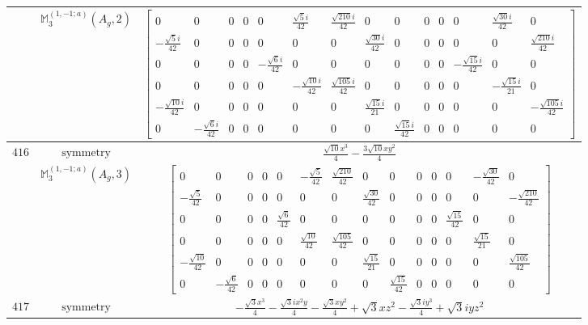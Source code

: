 \documentclass[fleqn,8pt,landscape]{jsarticle}
\begin{document}
\begin{longtable}{ccc}
$  $ & $ \mathbb{M}_{3}^{(1,-1;a)}(A_{g},2) $ & $ \begin{bmatrix} 0 & 0 & 0 & 0 & 0 & \frac{\sqrt{5} i}{42} & \frac{\sqrt{210} i}{42} & 0 & 0 & 0 & 0 & 0 & \frac{\sqrt{30} i}{42} & 0 \\ - \frac{\sqrt{5} i}{42} & 0 & 0 & 0 & 0 & 0 & 0 & \frac{\sqrt{30} i}{42} & 0 & 0 & 0 & 0 & 0 & \frac{\sqrt{210} i}{42} \\ 0 & 0 & 0 & 0 & - \frac{\sqrt{6} i}{42} & 0 & 0 & 0 & 0 & 0 & 0 & - \frac{\sqrt{15} i}{42} & 0 & 0 \\ 0 & 0 & 0 & 0 & 0 & - \frac{\sqrt{10} i}{42} & \frac{\sqrt{105} i}{42} & 0 & 0 & 0 & 0 & 0 & - \frac{\sqrt{15} i}{21} & 0 \\ - \frac{\sqrt{10} i}{42} & 0 & 0 & 0 & 0 & 0 & 0 & \frac{\sqrt{15} i}{21} & 0 & 0 & 0 & 0 & 0 & - \frac{\sqrt{105} i}{42} \\ 0 & - \frac{\sqrt{6} i}{42} & 0 & 0 & 0 & 0 & 0 & 0 & \frac{\sqrt{15} i}{42} & 0 & 0 & 0 & 0 & 0 \end{bmatrix} $ \\ \hline
$ 416 $ & $ \text{symmetry} $ & $ \frac{\sqrt{10} x^{3}}{4} - \frac{3 \sqrt{10} x y^{2}}{4} $ \\
$  $ & $ \mathbb{M}_{3}^{(1,-1;a)}(A_{g},3) $ & $ \begin{bmatrix} 0 & 0 & 0 & 0 & 0 & - \frac{\sqrt{5}}{42} & \frac{\sqrt{210}}{42} & 0 & 0 & 0 & 0 & 0 & - \frac{\sqrt{30}}{42} & 0 \\ - \frac{\sqrt{5}}{42} & 0 & 0 & 0 & 0 & 0 & 0 & \frac{\sqrt{30}}{42} & 0 & 0 & 0 & 0 & 0 & - \frac{\sqrt{210}}{42} \\ 0 & 0 & 0 & 0 & \frac{\sqrt{6}}{42} & 0 & 0 & 0 & 0 & 0 & 0 & \frac{\sqrt{15}}{42} & 0 & 0 \\ 0 & 0 & 0 & 0 & 0 & \frac{\sqrt{10}}{42} & \frac{\sqrt{105}}{42} & 0 & 0 & 0 & 0 & 0 & \frac{\sqrt{15}}{21} & 0 \\ - \frac{\sqrt{10}}{42} & 0 & 0 & 0 & 0 & 0 & 0 & \frac{\sqrt{15}}{21} & 0 & 0 & 0 & 0 & 0 & \frac{\sqrt{105}}{42} \\ 0 & - \frac{\sqrt{6}}{42} & 0 & 0 & 0 & 0 & 0 & 0 & \frac{\sqrt{15}}{42} & 0 & 0 & 0 & 0 & 0 \end{bmatrix} $ \\ \hline
$ 417 $ & $ \text{symmetry} $ & $ - \frac{\sqrt{3} x^{3}}{4} - \frac{\sqrt{3} i x^{2} y}{4} - \frac{\sqrt{3} x y^{2}}{4} + \sqrt{3} x z^{2} - \frac{\sqrt{3} i y^{3}}{4} + \sqrt{3} i y z^{2} $ \\

\end{longtable}
\end{document}
